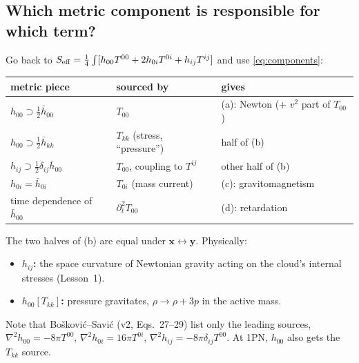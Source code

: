 \documentclass[11pt]{article}
\newcommand{\bx}{\mathbf{x}}\newcommand{\by}{\mathbf{y}}\newcommand{\bv}{\mathbf{v}}
\begin{document}
\subsection{Which metric component is responsible for which term?}
Go back to $S_{\rm eff}=\tfrac14\int[h_{00}T^{00}+2h_{0i}T^{0i}+h_{ij}T^{ij}]$ and use \eqref{eq:components}:
\begin{center}
\begin{tabular}{@{}lll@{}}
\toprule
metric piece & sourced by & gives\\\midrule
$h_{00}\supset\tfrac12\bar h_{00}$ & $T_{00}$ & (a): Newton (+ $v^2$ part of $T_{00}$)\\
$h_{00}\supset\tfrac12\bar h_{kk}$ & $T_{kk}$ (stress, ``pressure'') & half of (b)\\
$h_{ij}\supset\tfrac12\delta_{ij}\bar h_{00}$ & $T_{00}$, coupling to $T^{ij}$ & other half of (b)\\
$h_{0i}=\bar h_{0i}$ & $T_{0i}$ (mass current) & (c): gravitomagnetism\\
time dependence of $\bar h_{00}$ & $\partial_t^2T_{00}$ & (d): retardation\\\bottomrule
\end{tabular}
\end{center}
The two halves of (b) are equal under $\bx\leftrightarrow\by$. Physically:
\begin{itemize}[nosep]
\item \textbf{$h_{ij}$:} the space curvature of Newtonian gravity acting on the cloud's internal stresses (Lesson~1).
\item \textbf{$h_{00}[T_{kk}]$:} pressure gravitates, $\rho\to\rho+3p$ in the active mass.
\end{itemize}
Note that Bo\v{s}kovi\'c--Savi\'c (v2, Eqs.~27--29) list only the leading sources, $\nabla^2h_{00}=-8\pi T^{00}$, $\nabla^2h_{0i}=16\pi T^{0i}$, $\nabla^2h_{ij}=-8\pi\delta_{ij}T^{00}$. At 1PN, $h_{00}$ also gets the $T_{kk}$ source.
\end{document}
